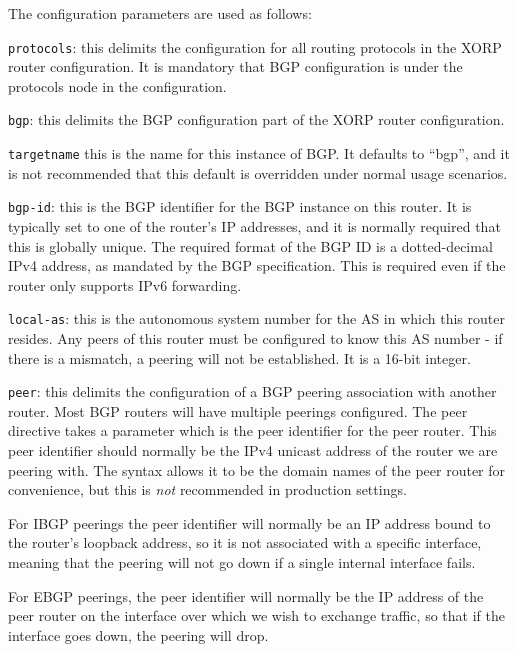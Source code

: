 \noindent
The configuration parameters are used as follows:
\begin{description}
\item{\tt protocols}: this delimits the configuration for all routing
  protocols in the XORP router configuration.  It is mandatory that
  BGP configuration is under the {\stt protocols} node in the
  configuration.
\item{\tt bgp}: this delimits the BGP configuration part of the XORP
  router configuration.
\item{\tt targetname} this is the name for this instance of BGP.  It
  defaults to ``{\stt bgp}'', and it is not recommended that this
  default is overridden under normal usage scenarios.
\item{\tt bgp-id}: this is the BGP identifier for the BGP instance on
  this router.  It is typically set to one of the router's IP
  addresses, and it is normally required that this is globally unique.
  The required format of the BGP ID is a dotted-decimal IPv4 address,
  as mandated by the BGP specification.  This is required even if the
  router only supports IPv6 forwarding.
\item{\tt local-as}: this is the autonomous system number for the AS
  in which this router resides.  Any peers of this router must be
  configured to know this AS number - if there is a mismatch, a
  peering will not be established.  It is a 16-bit integer.
\item{\tt peer}: this delimits the configuration of a BGP peering
  association with another router.  Most BGP routers will have
  multiple peerings configured.  The {\stt peer} directive takes a
  parameter which is the peer identifier for the peer router. This
  peer identifier should normally be the IPv4 unicast address of the
  router we are peering with.  The syntax allows it to be the domain
  names of the peer router for convenience, but this is {\it not}
  recommended in production settings.  

  For IBGP peerings the peer identifier will normally be an IP address
  bound to the router's loopback address, so it is not associated with
  a specific interface, meaning that the peering will not go down if a
  single internal interface fails.  

  For EBGP peerings, the peer identifier will normally be the IP
  address of the peer router on the interface over which we wish to
  exchange traffic, so that if the interface goes down, the peering
  will drop.


\end{description}
